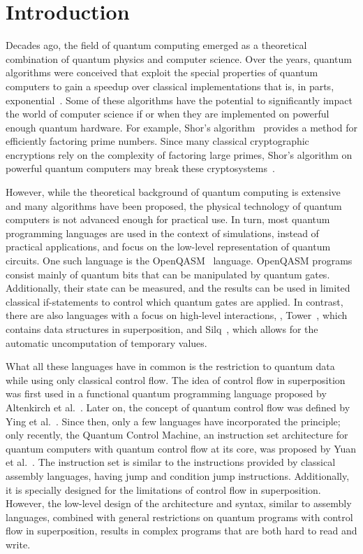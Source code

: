 \chapter{Introduction}
\label{ch:introduction}
Decades ago, the field of quantum computing emerged as a theoretical combination of quantum physics and computer science. Over the years, quantum algorithms were conceived that exploit the special properties of quantum computers to gain a speedup over classical implementations that is, in parts, exponential~\cite{BeVa93}. Some of these algorithms have the potential to significantly impact the world of computer science if or when they are implemented on powerful enough quantum hardware. For example, Shor's algorithm~\cite{Shor97} provides a method for efficiently factoring prime numbers. Since many classical cryptographic encryptions rely on the complexity of factoring large primes, Shor's algorithm on powerful quantum computers may break these cryptosystems~\cite{DiCh20}.

However, while the theoretical background of quantum computing is extensive and many algorithms have been proposed, the physical technology of quantum computers is not advanced enough for practical use. In turn, most quantum programming languages are used in the context of simulations, instead of practical applications, and focus on the low-level representation of quantum circuits. One such language is the OpenQASM~\cite{CBSG17} language. OpenQASM programs consist mainly of quantum bits that can be manipulated by quantum gates. Additionally, their state can be measured, and the results can be used in limited classical if-statements to control which quantum gates are applied. In contrast, there are also languages with a focus on high-level interactions, \eg, Tower~\cite{YuCa22}, which contains data structures in superposition, and Silq~\cite{BBGV20}, which allows for the automatic uncomputation of temporary values.

What all these languages have in common is the restriction to quantum data while using only classical control flow. The idea of control flow in superposition was first used in a functional quantum programming language proposed by Altenkirch et al.~\cite{AlGr05}. Later on, the concept of quantum control flow was defined by Ying et al.~\cite{YYF12}. Since then, only a few languages have incorporated the principle; only recently, the Quantum Control Machine, an instruction set architecture for quantum computers with quantum control flow at its core, was proposed by Yuan et al.~\cite{YVC24}.
The instruction set is similar to the instructions provided by classical assembly languages, having jump and condition jump instructions. Additionally, it is specially designed for the limitations of control flow in superposition. However, the low-level design of the architecture and syntax, similar to assembly languages, combined with general restrictions on quantum programs with control flow in superposition, results in complex programs that are both hard to read and write.

